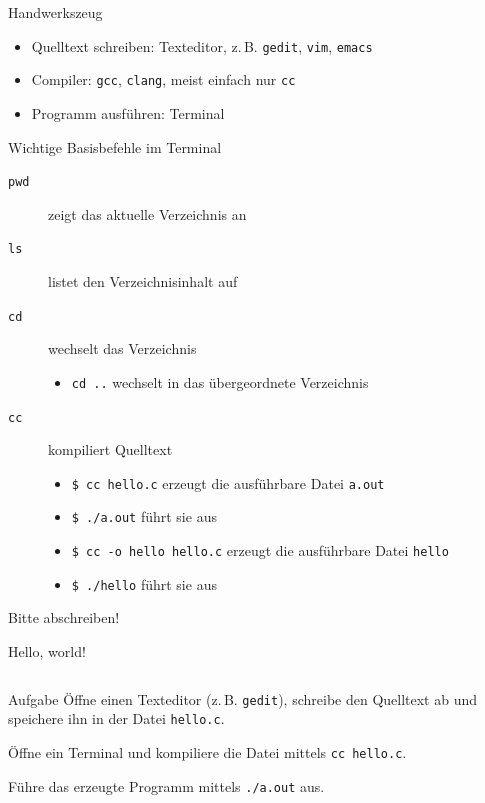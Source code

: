\documentclass[
  aspectratio=1610,
]{beamer}
\begin{document}
\begin{frame}{Handwerkszeug}
  \begin{itemize}
    \item Quelltext schreiben: Texteditor,
      z.\,B. \texttt{gedit}, \texttt{vim}, \texttt{emacs}
    \item Compiler: \texttt{gcc}, \texttt{clang}, meist einfach nur \texttt{cc}
    \item Programm ausführen: Terminal
  \end{itemize}

  \pause{}

  \begin{block}{Wichtige Basisbefehle im Terminal}
    \begin{description}
      \item[\texttt{pwd}] zeigt das aktuelle Verzeichnis an
      \item[\texttt{ls}] listet den Verzeichnisinhalt auf
      \item[\texttt{cd}] wechselt das Verzeichnis
        \begin{itemize}
          \item \texttt{cd ..} wechselt in das übergeordnete Verzeichnis %
        \end{itemize}
      \item[\texttt{cc}] kompiliert Quelltext
        \begin{itemize}
          \item \texttt{\$ cc hello.c} erzeugt die ausführbare Datei \texttt{a.out}
          \item \texttt{\$ ./a.out} führt sie aus
          \item \texttt{\$ cc -o hello hello.c} erzeugt die ausführbare Datei \texttt{hello}
          \item \texttt{\$ ./hello} führt sie aus
        \end{itemize}
    \end{description}
    Bitte abschreiben!
  \end{block}
\end{frame}

\begin{frame}{Hello, world!}
  \inputminted{c}{hello.c}

  \pause

  \begin{block}{Aufgabe}
    Öffne einen Texteditor (z.\,B. \texttt{gedit}), schreibe den Quelltext ab und
    speichere ihn in der Datei \texttt{hello.c}.

    Öffne ein Terminal und kompiliere die Datei mittels \texttt{cc hello.c}.

    Führe das erzeugte Programm mittels \texttt{./a.out} aus.
  \end{block}
\end{frame}
\end{document}
